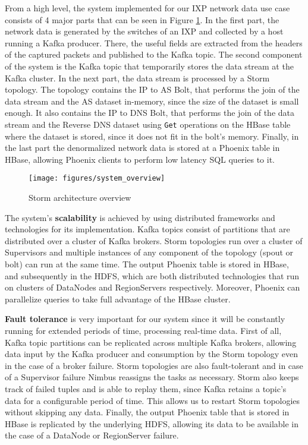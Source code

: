 From a high level, the system implemented for our IXP network data use case consists of 4 major parts that can be seen in Figure \ref{figure:system_overview}. In the first part, the network data is generated by the switches of an IXP and collected by a host running a Kafka producer. There, the useful fields are extracted from the headers of the captured packets and published to the Kafka topic. The second component of the system is the Kafka topic that temporarily stores the data stream at the Kafka cluster. In the next part, the data stream is processed by a Storm topology. The topology contains the IP to AS Bolt, that performs the join of the data stream and the AS dataset in-memory, since the size of the dataset is small enough. It also contains the IP to DNS Bolt, that performs the join of the data stream and the Reverse DNS dataset using \texttt{Get} operations on the HBase table where the dataset is stored, since it does not fit in the bolt's memory. Finally, in the last part the denormalized network data is stored at a Phoenix table in HBase, allowing Phoenix clients to perform low latency SQL queries to it.

\begin{figure}[h!]
\centering
\texttt{[image: figures/system\_overview]}
\caption{Storm architecture overview}
\label{figure:system_overview}
\end{figure}

The system's \textbf{scalability} is achieved by using distributed frameworks and technologies for its implementation. Kafka topics consist of partitions that are distributed over a cluster of Kafka brokers. Storm topologies run over a cluster of Supervisors and multiple instances of any component of the topology (spout or bolt) can run at the same time. The output Phoenix table is stored in HBase, and subsequently in the HDFS, which are both distributed technologies that run on clusters of DataNodes and RegionServers respectively. Moreover, Phoenix can parallelize queries to take full advantage of the HBase cluster.

\textbf{Fault tolerance} is very important for our system since it will be constantly running for extended periods of time, processing real-time data. First of all, Kafka topic partitions can be replicated across multiple Kafka brokers, allowing data input by the Kafka producer and consumption by the Storm topology even in the case of a broker failure. Storm topologies are also fault-tolerant and in case of a Supervisor failure Nimbus reassigns the tasks as necessary. Storm also keeps track of failed tuples and is able to replay them, since Kafka retains a topic's data for a configurable period of time. This allows us to restart Storm topologies without skipping any data. Finally, the output Phoenix table that is stored in HBase is replicated by the underlying HDFS, allowing its data to be available in the case of a DataNode or RegionServer failure.

